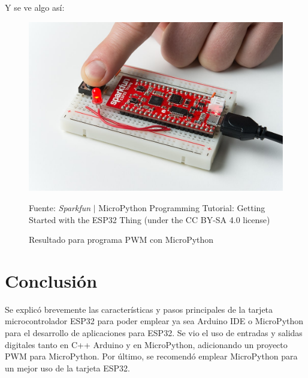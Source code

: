 \documentclass[conference]{IEEEtran}
\begin{document}
Y se ve algo así:

\begin{figure}[H]
\centering
\includegraphics[width=0.3\paperwidth]{images/esp32-micropython-pwm-photo}
\caption{Resultado para programa PWM con MicroPython} \footnotesize
Fuente: \textit{Sparkfun} $\mid$ MicroPython Programming Tutorial: Getting
Started with the ESP32 Thing \cite{hymel} (under the CC BY-SA 4.0 license)
\end{figure}

\section{Conclusión}\label{sec:conclusion}

Se explicó brevemente las características y pasos principales de la tarjeta
microcontrolador ESP32 para poder emplear ya sea Arduino IDE o MicroPython
para el desarrollo de aplicaciones para ESP32. Se vio el uso de entradas y
salidas digitales tanto en C++ Arduino y en MicroPython, adicionando un
proyecto PWM para MicroPython. Por último, se recomendó emplear MicroPython
para un mejor uso de la tarjeta ESP32.

\printbibliography
\end{document}
